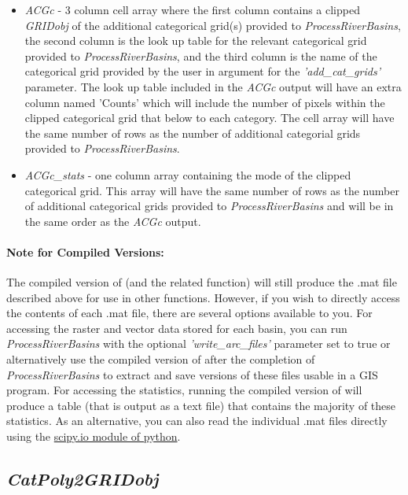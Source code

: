 \begin{enumerate}
\begin{itemize}
		\item \textit{ACGc} - 3 column cell array where the first column contains a clipped \textit{GRIDobj} of the additional categorical grid(s) provided to \textit{ProcessRiverBasins}, the second column is the look up table for the relevant categorical grid provided to \textit{ProcessRiverBasins}, and the third column is the name of the categorical grid provided by the user in argument for the \textit{'add\_cat\_grids'} parameter. The look up table included in the \textit{ACGc} output will have an extra column named 'Counts' which will include the number of pixels within the clipped categorical grid that below to each category. The cell array will have the same number of rows as the number of additional categorial grids provided to \textit{ProcessRiverBasins}.
		\item \textit{ACGc\_stats} - one column array containing the mode of the clipped categorical grid. This array will have the same number of rows as the number of additional categorical grids provided to \textit{ProcessRiverBasins} and will be in the same order as the \textit{ACGc} output.
	\end{itemize}	
\end{enumerate}

\paragraph{Note for Compiled Versions:} The compiled version of  (and the related  function) will still produce the .mat file described above for use in other functions. However, if you wish to directly access the contents of each .mat file, there are several options available to you. For accessing the raster and vector data stored for each basin, you can run \textit{ProcessRiverBasins} with the optional \textit{'write\_arc\_files'} parameter set to true or alternatively use the compiled version of  after the completion of \textit{ProcessRiverBasins} to extract and save versions of these files usable in a GIS program. For accessing the statistics, running the compiled version of  will produce a table (that is output as a text file) that contains the majority of these statistics. As an alternative, you can also read the individual .mat files directly using the \href{https://docs.scipy.org/doc/scipy/reference/tutorial/io.html}{scipy.io module of python}.

\subsection{\textit{CatPoly2GRIDobj}} \label{sec:CatGrid}
